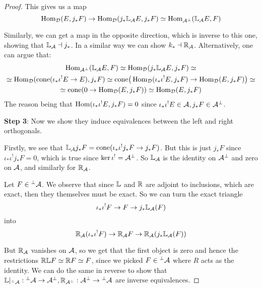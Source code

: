 \begin{proof}
    This gives us a map $$\operatorname{Hom}_{\mathcal{D}}(E, j_*F)\rightarrow \operatorname{Hom}_{\mathcal{D}}(j_*\mathbb{L}_{\mathcal{A}} E, j_*F)\simeq \operatorname{Hom}_{\mathcal{A}^\perp}(\mathbb{L}_{\mathcal{A}} E, F)$$

    Similarly, we can get a map in the opposite direction, which is inverse to this one, showing that $\mathbb{L}_{\mathcal{A}} \dashv j_*$. In a similar way we can show $k_* \dashv \mathbb{R}_{\mathcal{A}}$. Alternatively, one can argue that:
    \begin{gather*}
        \operatorname{Hom}_{\mathcal{A}^\perp}(\mathbb{L}_{\mathcal{A}} E, F)\simeq \operatorname{Hom}_{\mathcal{D}}(j_*\mathbb{L}_{\mathcal{A}} E, j_*F) \simeq \\
        \simeq \operatorname{Hom}_{\mathcal{D}} (\mathrm{cone}(\iota_* \iota^! E \rightarrow E), j_*F)\simeq \mathrm{cone}\big(\operatorname{Hom}_{\mathcal{D}}(\iota_* \iota^! E, j_* F)\rightarrow \operatorname{Hom}_{\mathcal{D}}(E, j_*F)\big)\simeq \\
        \simeq \mathrm{cone}(0\rightarrow \operatorname{Hom}_{\mathcal{D}}(E, j_*F))\simeq \operatorname{Hom}_{\mathcal{D}}(E, j_*F)
    \end{gather*}
    The reason being that $\operatorname{Hom}(\iota_* \iota^! E, j_* F)=0$ since $\iota_* \iota^! E\in \mathcal{A}, j_*F \in \mathcal{A}^\perp$.

    \textbf{Step 3}: Now we show they induce equivalences between the left and right orthogonals.

    Firstly, we see that $\mathbb{L}_{\mathcal{A}} j_* F = \mathrm{cone}(\iota_* \iota^! j_* F \rightarrow j_* F)$. But this is just $j_* F$ since $\iota_* \iota^! j_* F=0$, which is true since $\ker \iota^! = \mathcal{A}^\perp $. So $\mathbb{L}_{\mathcal{A}}$ is the identity on $\mathcal{A}^\perp$ and zero on $\mathcal{A}$, and similarly for $\mathbb{R}_{\mathcal{A}}$.

    Let $F\in \prescript{\perp}{}{}\mathcal{A}$. We observe that since $\mathbb{L}$ and $\mathbb{R}$ are adjoint to inclusions, which are exact, then they themselves must be exact. So we can turn the exact triangle $$\iota_* \iota^! F \rightarrow F \rightarrow j_*\mathbb{L}_{\mathcal{A}}(F)$$
    into $$\mathbb{R}_{\mathcal{A}}(\iota_* \iota^! F) \rightarrow \mathbb{R}_{\mathcal{A}} F \rightarrow \mathbb{R}_{\mathcal{A}} (j_*\mathbb{L}_{\mathcal{A}}(F))$$

    But $\mathbb{R}_{\mathcal{A}}$ vanishes on $\mathcal{A}$, so we get that the first object is zero and hence the restrictions $\mathbb{R} \mathbb{L} F \simeq \mathbb{R} F\simeq F$, since we picked $F\in \prescript{\perp}{}{}\mathcal{A}$ where $R$ acts as the identity. We can do the same in reverse to show that $\mathbb{L}|_{\prescript{\perp}{}{}\mathcal{A}}: \prescript{\perp}{}{}\mathcal{A} \rightarrow \mathcal{A}^\perp, \mathbb{R}_{\mathcal{A}^\perp}: \mathcal{A}^\perp \rightarrow \prescript{\perp}{}{}\mathcal{A}$ are inverse equivalences.


\end{proof}

